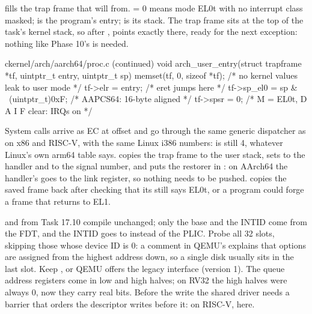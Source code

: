 \documentclass[11pt,a4paper]{article}
\begin{document}
 fills the trap frame that  will  from. 
= 0 means mode EL0t with no interrupt class masked;  is the program's entry;  is its stack.
The trap frame sits at the top of the task's kernel stack, so after ,  points exactly there,
ready for the next exception: nothing like Phase 10's  is needed.

\begin{lst}{c}{kernel/arch/aarch64/proc.c (continued)}
void arch_user_entry(struct trapframe *tf, uintptr_t entry, uintptr_t sp)
{
    memset(tf, 0, sizeof *tf);              /* no kernel values leak to user mode */
    tf->elr = entry;                        /* eret jumps here                    */
    tf->sp_el0 = sp & ~(uintptr_t)0xF;      /* AAPCS64: 16-byte aligned           */
    tf->spsr = 0;                           /* M = EL0t, D A I F clear: IRQs on   */
}
\end{lst}

System calls arrive as EC  at offset  and go through the same generic dispatcher as on x86 and
RISC-V, with the same Linux i386 numbers:  is still 4, whatever Linux's own arm64 table says.
 copies the trap frame to the user stack, sets  to the handler and  to
the signal number, and puts the restorer in : on AArch64 the handler's  goes to the link register,
so nothing needs to be pushed.  copies the saved frame back after checking that its
 still says EL0t, or a program could forge a frame that returns to EL1.

 and  from Task 17.10 compile unchanged; only the base and the
INTID come from the FDT, and the INTID goes to  instead of the PLIC. Probe all 32 slots,
skipping those whose device ID is 0: a comment in QEMU's  explains that  options are
assigned from the highest address down, so a single disk usually sits in the last slot. Keep
, or QEMU offers the legacy interface (version 1). The queue address
registers come in low and high halves; on RV32 the high halves were always 0, now they carry real bits. Before the
 write the shared driver needs a barrier that orders the descriptor writes before it: 
on RISC-V,  here.
\end{document}

